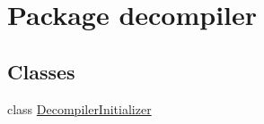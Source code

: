 \hypertarget{namespacedecompiler}{}\section{Package decompiler}
\label{namespacedecompiler}
\subsection*{Classes}
\begin{DoxyCompactItemize}
\item 
class \mbox{\hyperlink{classdecompiler_1_1_decompiler_initializer}{Decompiler\+Initializer}}
\end{DoxyCompactItemize}

